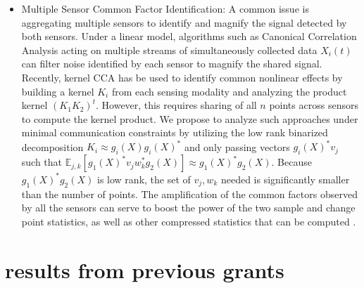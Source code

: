 \documentclass{article}
\begin{document}
\begin{itemize}
\item Multiple Sensor Common Factor Identification: A common issue is aggregating multiple sensors to identify and magnify the signal detected by both sensors.  Under a linear model, algorithms such as Canonical Correlation Analysis \cite{} acting on multiple streams of simultaneously collected data $X_i(t)$ can filter noise identified by each sensor to magnify the shared signal.  Recently, kernel CCA \cite{Talmon Lederman} has be used to identify common nonlinear effects by building a kernel $K_i$ from each sensing modality and analyzing the product kernel $(K_1 K_2)^t$.  However, this requires sharing of all $n$ points across sensors to compute the kernel product.  We propose to analyze such approaches under minimal communication constraints by utilizing the low rank binarized decomposition $K_i \approx g_i(X) g_i(X)^*$ and only passing vectors $g_i(X)^* v_j$ such that $\mathbb{E}_{j,k}[g_1(X)^* v_j w_k^* g_2(X)] \approx g_1(X)^* g_2(X)$.  Because $g_1(X)^* g_2(X)$ is low rank, the set of $v_j, w_k$ needed is significantly smaller than the number of points.  The amplification of the common factors observed by all the sensors can serve to boost the power of the two sample and change point statistics, as well as other compressed statistics that can be computed \cite{Griboval}.

\end{itemize}





\section{results from previous grants}
\end{document}
